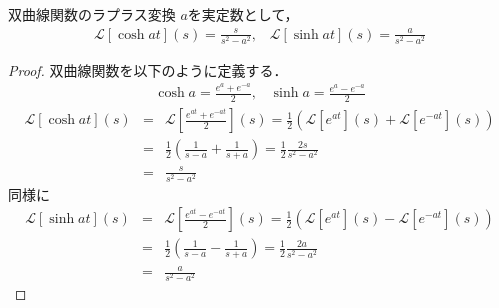 \begin{exprbox}{双曲線関数のラプラス変換}
    $a$を実定数として，
    \begin{eqnarray}
        \mathcal{L}[\cosh at](s) = \frac{s}{s^2 - a^2},\hspace{10pt}\mathcal{L}[\sinh at](s) = \frac{a}{s^2 - a^2}
    \end{eqnarray}
    \begin{proof}
        双曲線関数を以下のように定義する．
        \begin{eqnarray}
            \cosh a = \frac{e^{a} + e^{-a}}{2},\hspace{10pt}\sinh a = \frac{e^{a} - e^{-a}}{2}
        \end{eqnarray}
        \begin{eqnarray*}
            \mathcal{L}[\cosh at](s) &=& \mathcal{L}[\frac{e^{at} + e^{-at}}{2}](s)
            = \frac{1}{2}\left(\mathcal{L}[e^{at}](s) + \mathcal{L}[e^{-at}](s)\right)\\
            &=& \frac{1}{2} \left(\frac{1}{s - a} + \frac{1}{s + a}\right)
            = \frac{1}{2} \frac{2s}{s^2 - a^2} \\
            &=& \frac{s}{s^2 - a^2}
        \end{eqnarray*}
        同様に
        \begin{eqnarray*}
            \mathcal{L}[\sinh at](s) &=& \mathcal{L}[\frac{e^{at} - e^{-at}}{2}](s)
            = \frac{1}{2}\left(\mathcal{L}[e^{at}](s) - \mathcal{L}[e^{-at}](s)\right)\\
            &=& \frac{1}{2} \left(\frac{1}{s - a} - \frac{1}{s + a}\right)
            = \frac{1}{2} \frac{2a}{s^2 - a^2} \\
            &=& \frac{a}{s^2 - a^2}
        \end{eqnarray*}
    \end{proof}
\end{exprbox}

